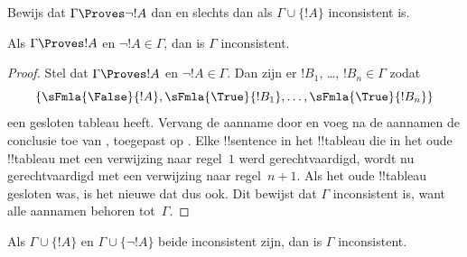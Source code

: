 \documentclass[../../../include/open-logic-section]{subfiles}
\begin{document}
\begin{prob}
Bewijs dat $\Gamma \Proves \lnot !A$ dan en slechts dan als
$\Gamma \cup \{!A\}$ inconsistent is.
\end{prob}

\begin{prop}
  Als $\Gamma \Proves !A$ en $\lnot !A \in \Gamma$, dan is $\Gamma$
  inconsistent.
\end{prop}

\begin{proof}
  Stel dat $\Gamma \Proves !A$ en $\lnot !A \in \Gamma$. Dan zijn er
  $!B_1$, \dots, $!B_n \in \Gamma$ zodat \
  \[
  \{\sFmla{\False}{!A}, \sFmla{\True}{!B_1}, \dots, \sFmla{\True}{!B_n}\}
  \]
  een gesloten tableau heeft. Vervang de aanname
   door  en voeg na de
  aannamen de conclusie toe van \TRule{\True}{\lnot}, toegepast op
  \sFmla{\False}{!A}. Elke !!{sentence} in het !!{tableau} die in het
  oude !!{tableau} met een verwijzing naar regel~$1$ werd
  gerechtvaardigd, wordt nu gerechtvaardigd met een verwijzing naar
  regel~$n+1$. Als het oude !!{tableau} gesloten was, is het nieuwe dat
  dus ook. Dit bewijst dat $\Gamma$ inconsistent is, want alle aannamen
  behoren tot~$\Gamma$.
\end{proof}

\begin{prop}
  Als $\Gamma \cup \{!A\}$ en $\Gamma \cup \{\lnot !A\}$ beide
  inconsistent zijn, dan is $\Gamma$ inconsistent.
\end{prop}
\end{document}
